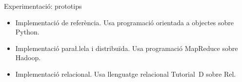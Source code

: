 \begin{frame}{Experimentació: prototips}

  \begin{itemize}
  \item Implementació de referència. Usa programació orientada a
    objectes sobre Python.
  \item Implementació para\l.lela i distribuïda. Usa programació MapReduce sobre Hadoop.
  \item Implementació relacional. Usa llenguatge relacional Tutorial~D sobre Rel.
  \end{itemize}





\end{frame}


